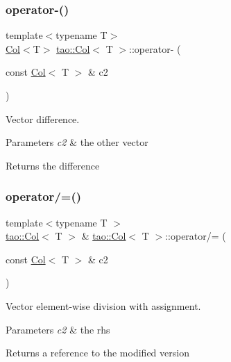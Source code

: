 \subsubsection{\texorpdfstring{operator-\/()}{operator-()}}
{\footnotesize\ttfamily template$<$typename T$>$ \\
\mbox{\hyperlink{classtao_1_1_col}{Col}}$<$T$>$ \mbox{\hyperlink{classtao_1_1_col}{tao\+::\+Col}}$<$ T $>$\+::operator-\/ (\begin{DoxyParamCaption}\item[{const \mbox{\hyperlink{classtao_1_1_col}{Col}}$<$ T $>$ \&}]{c2 }\end{DoxyParamCaption})\hspace{0.3cm}{\ttfamily [inline]}}



Vector difference. 


\begin{DoxyParams}{Parameters}
{\em c2} & the other vector \\
\hline
\end{DoxyParams}
\begin{DoxyReturn}{Returns}
the difference 
\end{DoxyReturn}
\mbox{\label{classtao_1_1_col_ab51f1d091fdb1b5a6a4199f4253ecfaa}} 
\subsubsection{\texorpdfstring{operator/=()}{operator/=()}\hspace{0.1cm}{\footnotesize\ttfamily [1/2]}}
{\footnotesize\ttfamily template$<$typename T $>$ \\
\mbox{\hyperlink{classtao_1_1_col}{tao\+::\+Col}}$<$ T $>$ \& \mbox{\hyperlink{classtao_1_1_col}{tao\+::\+Col}}$<$ T $>$\+::operator/= (\begin{DoxyParamCaption}\item[{const \mbox{\hyperlink{classtao_1_1_col}{Col}}$<$ T $>$ \&}]{c2 }\end{DoxyParamCaption})}



Vector element-\/wise division with assignment. 


\begin{DoxyParams}{Parameters}
{\em c2} & the rhs \\
\hline
\end{DoxyParams}
\begin{DoxyReturn}{Returns}
a reference to the modified version 
\end{DoxyReturn}
\mbox{\label{classtao_1_1_col_abddd1e9737a0cafd50a52fd5063e4851}} 
